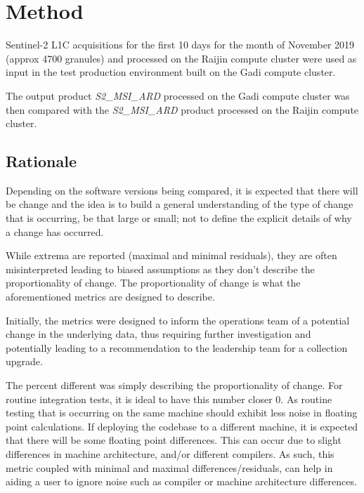 \documentclass[a4paper]{article}
\begin{document}
    \section{Method}

      \begin{flushleft}
        Sentinel-2 L1C acquisitions for the first 10 days for the month of November 2019 (approx 4700 granules) and processed on the Raijin compute cluster were used as input in the test production environment built on the Gadi compute cluster. \par
        The output product \textit{S2\_MSI\_ARD} processed on the Gadi compute cluster was then compared with the \textit{S2\_MSI\_ARD} product processed on the Raijin compute cluster.
      \end{flushleft}

    \subsection{Rationale}

      \begin{flushleft}
        Depending on the software versions being compared, it is expected that there will be change and the idea is to build a general understanding of the type of change that is occurring, be that large or small; not to define the explicit details of why a change has occurred. \par
        While extrema are reported (maximal and minimal residuals), they are often misinterpreted leading to biased assumptions as they don't describe the proportionality of change. The proportionality of change is what the aforementioned metrics are designed to describe. \par
        Initially, the metrics were designed to inform the operations team of a potential change in the underlying data, thus requiring further investigation and potentially leading to a recommendation to the leadership team for a collection upgrade. \par
        The percent different was simply describing the proportionality of change. For routine integration tests, it is ideal to have this number closer 0. As routine testing that is occurring on the same machine should exhibit less noise in floating point calculations. If deploying the codebase to a different machine, it is expected that there will be some floating point differences. This can occur due to slight differences in machine architecture, and/or different compilers. As such, this metric coupled with minimal and maximal differences/residuals, can help in aiding a user to ignore noise such as compiler or machine architecture differences. \par
      \end{flushleft}
\end{document}
